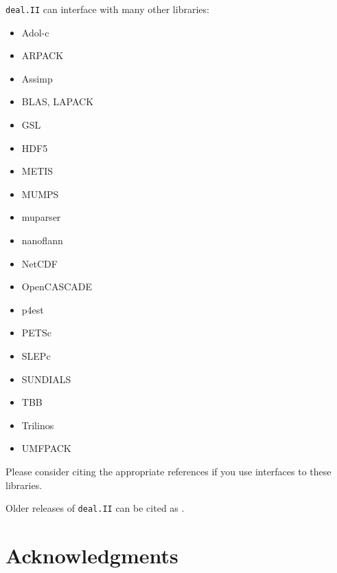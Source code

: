 \documentclass{ansarticle-preprint}
\newcommand{\specialword}[1]{\texttt{#1}}
\newcommand{\dealii}{{\specialword{deal.II}}}
\begin{document}
\dealii{} can interface with many other libraries:
\begin{multicols}{3}
\begin{itemize}
\item Adol-c \cite{adol-c}
\item ARPACK \cite{arpack}
\item Assimp \cite{assimp}
\item BLAS, LAPACK
\item GSL \cite{gsl2016}
\item HDF5 \cite{hdf5}
\item METIS \cite{karypis1998fast}
\item MUMPS \cite{ADE00,MUMPS:1,MUMPS:2,mumps-web-page}
\item muparser \cite{muparser-web-page}
\item nanoflann \cite{nanoflann}
\item NetCDF \cite{rew1990netcdf}
\item OpenCASCADE \cite{opencascade-web-page}
\item p4est \cite{p4est}
\item PETSc \cite{petsc-user-ref,petsc-web-page}
\item SLEPc \cite{Hernandez:2005:SSF}
\item SUNDIALS \cite{sundials}
\item TBB \cite{Rei07}
\item Trilinos \cite{trilinos,trilinos-web-page}
\item UMFPACK \cite{umfpack}
\end{itemize}
\end{multicols}
Please consider citing the appropriate references if you use interfaces to these
libraries.

Older releases of \dealii{} can be cited as
\cite{dealII80,dealII81,dealII82,dealII83,dealII84,dealII85}.

\nocite{BangerthKanschat1999}

\section{Acknowledgments}
\end{document}
